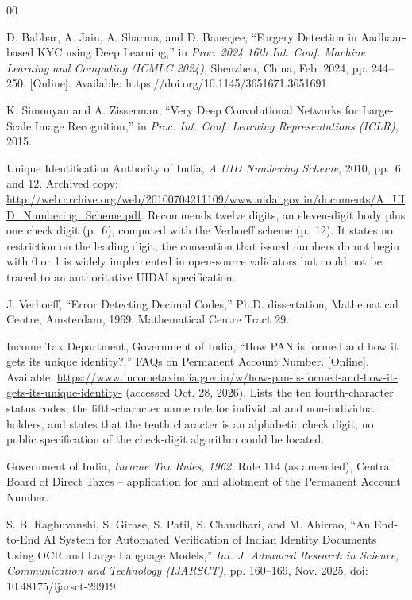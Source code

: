 \documentclass[conference]{IEEEtran}
\begin{document}
\begin{thebibliography}{00}

 D. Babbar, A. Jain, A. Sharma, and D. Banerjee,
``Forgery Detection in Aadhaar-based KYC using Deep Learning,'' in
\emph{Proc. 2024 16th Int. Conf. Machine Learning and Computing (ICMLC
2024)}, Shenzhen, China, Feb. 2024, pp. 244--250. [Online]. Available:
https://doi.org/10.1145/3651671.3651691

 K. Simonyan and A. Zisserman, ``Very Deep Convolutional
Networks for Large-Scale Image Recognition,'' in \emph{Proc. Int.
Conf. Learning Representations (ICLR)}, 2015.

 Unique Identification Authority of India,
\emph{A UID Numbering Scheme}, 2010, pp.~6 and 12. Archived copy:
\url{http://web.archive.org/web/20100704211109/www.uidai.gov.in/documents/A_UID_Numbering_Scheme.pdf}.
Recommends twelve digits, an eleven-digit body plus one check digit
(p.~6), computed with the Verhoeff scheme (p.~12). It states no
restriction on the leading digit; the convention that issued numbers do
not begin with 0 or 1 is widely implemented in open-source validators
but could not be traced to an authoritative UIDAI specification.

 J. Verhoeff, ``Error Detecting Decimal Codes,''
Ph.D. dissertation, Mathematical Centre, Amsterdam, 1969, Mathematical
Centre Tract 29.

 Income Tax Department, Government of India, ``How
PAN is formed and how it gets its unique identity?,'' FAQs on Permanent
Account Number. [Online]. Available:
\url{https://www.incometaxindia.gov.in/w/how-pan-is-formed-and-how-it-gets-its-unique-identity-}
(accessed Oct. 28, 2026). Lists the ten fourth-character status codes,
the fifth-character name rule for individual and non-individual holders,
and states that the tenth character is an alphabetic check digit; no
public specification of the check-digit algorithm could be located.

 Government of India, \emph{Income Tax Rules, 1962},
Rule 114 (as amended), Central Board of Direct Taxes -- application for
and allotment of the Permanent Account Number.

 S. B. Raghuvanshi, S. Girase, S. Patil,
S. Chaudhari, and M. Ahirrao, ``An End-to-End AI System for Automated
Verification of Indian Identity Documents Using OCR and Large Language
Models,'' \emph{Int. J. Advanced Research in Science, Communication
and Technology (IJARSCT)}, pp. 160--169, Nov. 2025,
doi: 10.48175/ijarsct-29919.


\end{thebibliography}
\end{document}
